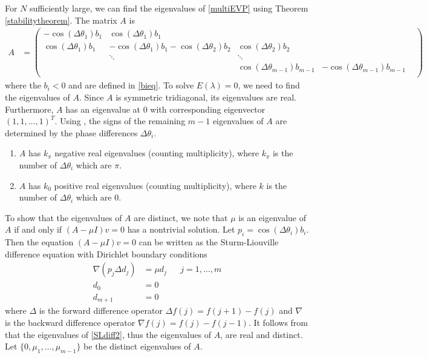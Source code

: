 \documentclass[12pt]{article}
\begin{document}
For $N$ sufficiently large, we can find the eigenvalues of \eqref{multiEVP} using Theorem \ref{stabilitytheorem}. The matrix $A$ is
\begin{align}\label{AdNLS}
A &= \begin{pmatrix}
-\cos(\Delta\theta_1) b_1 & \cos(\Delta\theta_1) b_1 & & &  \\
\cos(\Delta\theta_1) b_1 & -\cos(\Delta\theta_1) b_1 - \cos(\Delta\theta_2) b_2 & \cos(\Delta\theta_2) b_2 \\
& \ddots & \ddots \\
& &  \cos(\Delta\theta_{m-1}) b_{m-1} & -\cos(\Delta\theta_{m-1}) b_{m-1}  \\
\end{pmatrix}
\end{align}
where the $b_i < 0$ and are defined in \eqref{bieq}. To solve $E(\lambda) = 0$, we need to find the eigenvalues of $A$. Since $A$ is symmetric tridiagonal, its eigenvalues are real. Furthermore, $A$ has an eigenvalue at 0 with corresponding eigenvector $(1, 1, \dots, 1)^T$. Using \cite[Lemma 5.4]{Sandstede1998}, the signs of the remaining $m-1$ eigenvalues of $A$ are determined by the phase differences $\Delta\theta_i$.  
\begin{enumerate}
	\item $A$ has $k_\pi$ negative real eigenvalues (counting multiplicity), where $k_\pi$ is the number of $\Delta\theta_i$ which are $\pi$. 
	\item $A$ has $k_0$ positive real eigenvalues (counting multiplicity), where $k$ is the number of $\Delta\theta_i$ which are $0$. 
\end{enumerate}
To show that the eigenvalues of $A$ are distinct, we note that $\mu$ is an eigenvalue of $A$ if and only if $(A - \mu I)v = 0$ has a nontrivial solution. Let $p_i = \cos(\Delta\theta_i) b_i$. Then the equation $(A - \mu I)v = 0$ can be written as the Sturm-Liouville difference equation with Dirichlet boundary conditions
\begin{equation}\label{SLdiff2}
\begin{aligned}
\nabla( p_j \Delta d_j ) &= \mu d_j && j = 1, \dots, m \\
d_0 &= 0 \\
d_{m+1} &= 0
\end{aligned}
\end{equation}
where $\Delta$ is the forward difference operator $\Delta f(j) = f(j+1) - f(j)$ and $\nabla$ is the backward difference operator $\nabla f(j) = f(j) - f(j-1)$. It follows from \cite[Corollary 2.2.7]{Jirari1995} that the eigenvalues of \eqref{SLdiff2}, thus the eigenvalues of $A$, are real and distinct. Let $\{0, \mu_1, \dots, \mu_{m-1}\}$ be the distinct eigenvalues of $A$.
\end{document}
